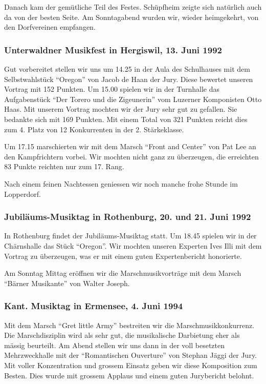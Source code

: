 \begin{history}
    Danach kam der gemütliche Teil des Festes. Schüpfheim zeigte sich natürlich
    auch da von der besten Seite. Am Sonntagabend wurden wir, wieder
    heimgekehrt, von den Dorfvereinen empfangen.


    \subsubsection*{Unterwaldner Musikfest in Hergiswil, 13. Juni 1992}

    Gut vorbereitet stellen wir uns um 14.25 in der Aula des Schulhauses mit dem
    Selbstwahlstück \enquote{Oregon} von Jacob de Haan der Jury. Diese bewertet
    unseren Vortrag mit 152 Punkten. Um 15.00 spielen wir in der Turnhalle das
    Aufgabenstück \enquote{Der Torero und die Zigeunerin} vom Luzerner
    Komponisten Otto Haas. Mit unserem Vortrag mochten wir der Jury sehr gut zu
    gefallen. Sie bedankte sich mit 169 Punkten. Mit einem Total von 321 Punkten
    reicht dies zum 4. Platz von 12 Konkurrenten in der 2. Stärkeklasse.

    Um 17.15 marschierten wir mit dem Marsch \enquote{Front and Center} von Pat
    Lee an den Kampfrichtern vorbei. Wir mochten nicht ganz zu überzeugen, die
    erreichten 83 Punkte reichten nur zum 17. Rang.

    Nach einem feinen Nachtessen geniessen wir  noch manche frohe Stunde im
    Lopperdorf.


    \subsubsection*{Jubiläums-Musiktag in Rothenburg, 20. und 21. Juni 1992}

    In Rothenburg findet der Jubiläums-Musiktag statt. Um 18.45 spielen wir in
    der Chärnshalle das Stück \enquote{Oregon}. Wir mochten unseren Experten
    Ives Illi mit dem Vortrag zu überzeugen, was er mit einem guten
    Expertenbericht honorierte.

    Am Sonntag Mittag eröffnen wir die Marschmusikvorträge mit dem Marsch
    \enquote{Bärner Musikante} von Walter Joseph.


    \subsubsection*{Kant. Musiktag in Ermensee, 4. Juni 1994}

    Mit dem Marsch \enquote{Gret little Army} bestreiten wir die
    Marschmusikkonkurrenz. Die Marschdisziplin wird als sehr gut, die
    musikalische Darbietung eher als mässig beurteilt. Am Abend stellen wir uns
    dann in der voll besetzten Mehrzweckhalle mit der \enquote{Romantischen
        Ouverture} von Stephan Jäggi der Jury. Mit voller Konzentration und grossem
    Einsatz geben wir diese Komposition zum Besten. Dies wurde mit grossem
    Applaus und einem guten Jurybericht belohnt.


\end{history}
